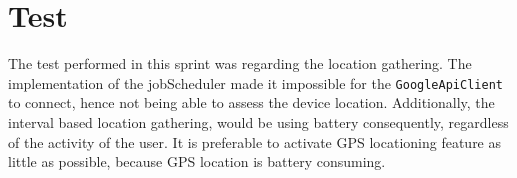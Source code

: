 \section{Test}
The test performed in this sprint was regarding the location gathering.
The implementation of the jobScheduler made it impossible for the \texttt{GoogleApiClient} to connect, hence not being able to assess the device location.
Additionally, the interval based location gathering, would be using battery consequently, regardless of the activity of the user. 
It is preferable to activate GPS locationing feature as little as possible, because GPS location is battery consuming.


